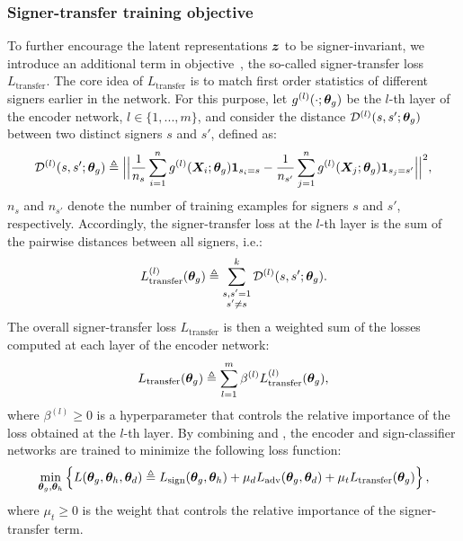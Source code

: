 \subsubsection{Signer-transfer training objective}
To further encourage the latent representations ${\bm{z}}$ to be signer-invariant, we introduce an additional term in objective~, the so-called signer-transfer loss $L_{\text{transfer}}$. The core idea of $L_{\text{transfer}}$ is to match first order statistics of different signers earlier in the network. For this purpose, let $g^{(l)}(\cdot;{\bm{\theta}}_g)$ be the $l$-th layer of the encoder network, $l \in \{1,...,m\}$, and consider the distance ${\mathcal{D}}^{(l)}(s, s'; {\bm{\theta}}_g)$ between two distinct signers $s$ and $s'$, defined as:
\begin{equation}
\label{eq:sign_transfer_pairwise_loss}
{\mathcal{D}}^{(l)}(s, s'; {\bm{\theta}}_g) \triangleq \Big|\Big| \frac{1}{n_s} \sum_{i=1}^n g^{(l)}({\bm{X}}_{i}; {\bm{\theta}}_g) \bm{1}_{s_i = s} - \frac{1}{n_{s'}}\sum_{j=1}^n g^{(l)}({\bm{X}}_{j}; {\bm{\theta}}_g) \bm{1}_{s_j = s'} \Big|\Big|^2,
\end{equation}
$n_s$ and $n_{s'}$ denote the number of training examples for signers $s$ and $s'$, respectively. Accordingly, the signer-transfer loss at the $l$-th layer is the sum of the pairwise distances between all signers, i.e.:
\begin{equation}
L_{\text{transfer}}^{(l)}({\bm{\theta}}_g) \triangleq \sum_{\substack{s,s'=1 \\ s' \neq s}}^k {\mathcal{D}}^{(l)}(s,s'; {\bm{\theta}}_g).
\end{equation}
The overall signer-transfer loss $L_{\text{transfer}}$ is then a weighted sum of the losses computed at each layer of the encoder network:
\begin{equation}
\label{eq:signer_transfer_loss}
L_{\text{transfer}}({\bm{\theta}}_g) \triangleq \sum_{l=1}^{m} \beta^{(l)} L_{\text{transfer}}^{(l)}({\bm{\theta}}_g),
\end{equation}
where $\beta^{(l)}\geq 0$ is a hyperparameter that controls the relative importance of the loss obtained at the $l$-th layer.
By combining  and , the encoder and sign-classifier networks are trained to minimize the following loss function:
\begin{equation}
\label{eq:enc_sign_loss}
\min_{{\bm{\theta}}_g, {\bm{\theta}}_h} \left\lbrace L({\bm{\theta}}_g, {\bm{\theta}}_h, {\bm{\theta}}_d) \triangleq L_{\text{sign}}({\bm{\theta}}_g, {\bm{\theta}}_h) + \mu_d L_{\text{adv}}({\bm{\theta}}_g, {\bm{\theta}}_d) +
\mu_t L_{\text{transfer}}({\bm{\theta}}_g) \right\rbrace,
\end{equation}
where $\mu_t \geq 0$ is the weight that controls the relative importance of the signer-transfer term.

